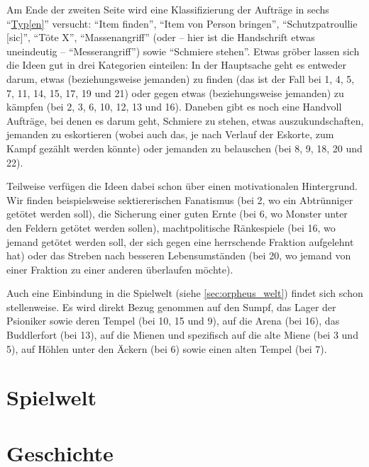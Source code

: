 \documentclass[a5paper,pagesize,numbers=noenddot]{scrbook}
\begin{document}
Am Ende der zweiten Seite wird eine Klassifizierung der Aufträge in sechs \enquote{\uline{Typ[en]}} versucht:
\enquote{Item finden}, \enquote{Item von Person bringen}, \enquote{Schutzpatroullie [sic]}, \enquote{Töte X}, \enquote{Massenangriff} (oder -- hier ist die Handschrift etwas uneindeutig -- \enquote{Messerangriff}) sowie \enquote{Schmiere stehen}.
Etwas gröber lassen sich die Ideen gut in drei Kategorien einteilen:
In der Hauptsache geht es entweder darum, etwas (beziehungsweise jemanden) zu finden (das ist der Fall bei 1, 4, 5, 7, 11, 14, 15, 17, 19 und 21) oder gegen etwas (beziehungsweise jemanden) zu kämpfen (bei 2, 3, 6, 10, 12, 13 und 16).
Daneben gibt es noch eine Handvoll Aufträge, bei denen es darum geht, Schmiere zu stehen, etwas auszukundschaften, jemanden zu eskortieren (wobei auch das, je nach Verlauf der Eskorte, zum Kampf gezählt werden könnte) oder jemanden zu belauschen (bei 8, 9, 18, 20 und 22).

Teilweise verfügen die Ideen dabei schon über einen motivationalen Hintergrund.
Wir finden beispielsweise sektiererischen Fanatismus (bei 2, wo ein Abtrünniger getötet werden soll), die Sicherung einer guten Ernte (bei 6, wo Monster unter den Feldern getötet werden sollen), machtpolitische Ränkespiele (bei 16, wo jemand getötet werden soll, der sich gegen eine herrschende Fraktion aufgelehnt hat) oder das Streben nach besseren Lebensumständen (bei 20, wo jemand von einer Fraktion zu einer anderen überlaufen möchte).

Auch eine Einbindung in die Spielwelt (siehe \autoref{sec:orpheus_welt}) findet sich schon stellenweise.
Es wird direkt Bezug genommen auf den Sumpf, das Lager der Psioniker sowie deren Tempel (bei 10, 15 und 9), auf die Arena (bei 16), das Buddlerfort (bei 13), auf die Mienen und spezifisch auf die alte Miene (bei 3 und 5), auf Höhlen unter den Äckern (bei 6) sowie einen alten Tempel (bei 7).


\clearpage
\section{Spielwelt}\label{sec:orpheus_welt}


\clearpage
\section{Geschichte}\label{sec:orpheus_geschichte}
\end{document}

